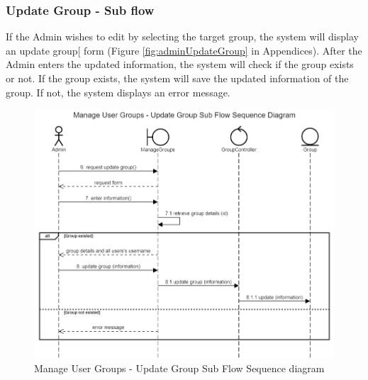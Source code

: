 \subsubsection{Update Group - Sub flow}
If the Admin wishes to edit by selecting the target group, the system will display an update group[ form (Figure \ref{fig:adminUpdateGroup} in Appendices). After the Admin enters the updated information, the system will check if the group exists or not. If the group exists, the system will save the updated information of the group. If not, the system displays an error message. 
\begin{figure}[H]
    \centering
    \includegraphics[width=1.0\textwidth]{images/Manage User Groups - Update Group Sub Flow Sequence Diagram.png}
    \caption{Manage User Groups - Update Group Sub Flow Sequence diagram}
    \label{fig:SeqGroupsUpdate}
\end{figure}
